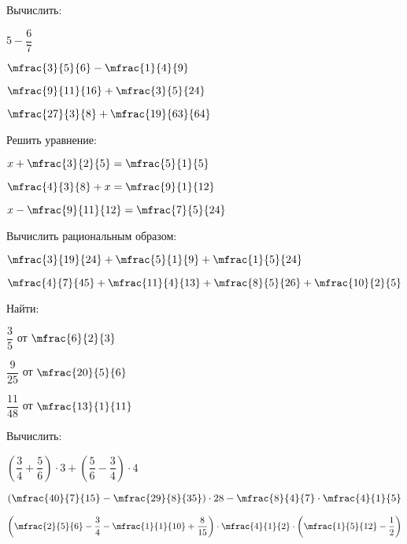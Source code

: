 \begin{class}[type=class, number=3]
	\begin{listofex}
		\item Вычислить:
		\begin{enumcols}[itemcolumns=4]
			\item \( 5-\dfrac{6}{7} \)
			\item \( \mfrac{3}{5}{6}-\mfrac{1}{4}{9} \)
			\item \( \mfrac{9}{11}{16}+\mfrac{3}{5}{24} \)
			\item \( \mfrac{27}{3}{8}+\mfrac{19}{63}{64} \)
		\end{enumcols}
		\item Решить уравнение:
		\begin{enumcols}[itemcolumns=3]
			\item \( x+\mfrac{3}{2}{5}=\mfrac{5}{1}{5} \)
			\item \( \mfrac{4}{3}{8}+x=\mfrac{9}{1}{12} \)
			\item \( x-\mfrac{9}{11}{12}=\mfrac{7}{5}{24} \)
		\end{enumcols}
		\item Вычислить рациональным образом:
		\begin{enumcols}[itemcolumns=2]
			\item \( \mfrac{3}{19}{24}+\mfrac{5}{1}{9}+\mfrac{1}{5}{24} \)
			\item \( \mfrac{4}{7}{45}+\mfrac{11}{4}{13}+\mfrac{8}{5}{26}+\mfrac{10}{2}{5} \)
		\end{enumcols}
		\item Найти:
		\begin{enumcols}[itemcolumns=3]
			\item \( \dfrac{3}{5} \) от \( \mfrac{6}{2}{3} \)
			\item \( \dfrac{9}{25} \) от \( \mfrac{20}{5}{6} \)
			\item \( \dfrac{11}{48} \) от \( \mfrac{13}{1}{11} \)
		\end{enumcols}
		\item Вычислить: %
		\begin{enumcols}[itemcolumns=2]
			\item \( \left( \dfrac{3}{4}+\dfrac{5}{6} \right)\cdot3+\left( \dfrac{5}{6}-\dfrac{3}{4} \right)\cdot4 \)
			\item \( \left( \mfrac{40}{7}{15}-\mfrac{29}{8}{35} \right)\cdot28-\mfrac{8}{4}{7}\cdot\mfrac{4}{1}{5} \)
			\item \( \left( \mfrac{2}{5}{6}-\dfrac{3}{4}-\mfrac{1}{1}{10}+\dfrac{8}{15} \right)\cdot\mfrac{4}{1}{2}\cdot\left( \mfrac{1}{5}{12}-\dfrac{1}{2} \right) \)

\end{enumcols}
\end{listofex}
\end{class}
